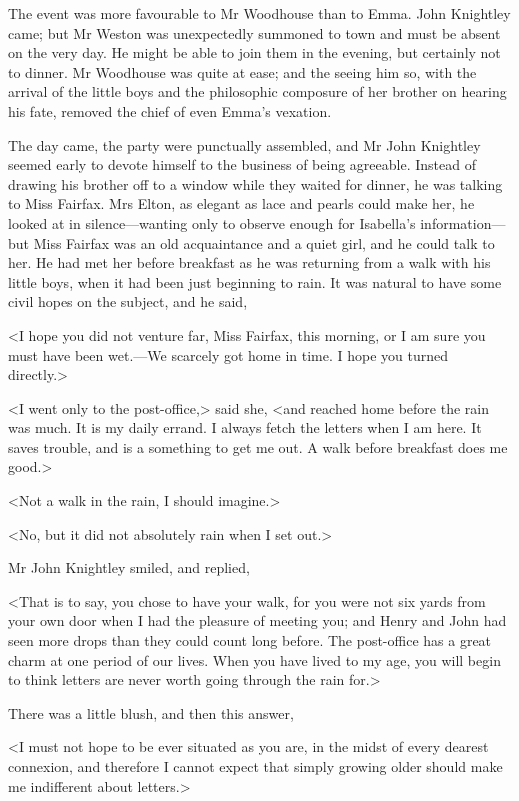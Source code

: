 The event was more favourable to Mr Woodhouse than to Emma. John Knightley came; but Mr Weston was unexpectedly summoned to town and must be absent on the very day. He might be able to join them in the evening, but certainly not to dinner. Mr Woodhouse was quite at ease; and the seeing him so, with the arrival of the little boys and the philosophic composure of her brother on hearing his fate, removed the chief of even Emma's vexation.

The day came, the party were punctually assembled, and Mr John Knightley seemed early to devote himself to the business of being agreeable. Instead of drawing his brother off to a window while they waited for dinner, he was talking to Miss Fairfax. Mrs Elton, as elegant as lace and pearls could make her, he looked at in silence—wanting only to observe enough for Isabella's information—but Miss Fairfax was an old acquaintance and a quiet girl, and he could talk to her. He had met her before breakfast as he was returning from a walk with his little boys, when it had been just beginning to rain. It was natural to have some civil hopes on the subject, and he said,

<I hope you did not venture far, Miss Fairfax, this morning, or I am sure you must have been wet.—We scarcely got home in time. I hope you turned directly.>

<I went only to the post-office,> said she, <and reached home before the rain was much. It is my daily errand. I always fetch the letters when I am here. It saves trouble, and is a something to get me out. A walk before breakfast does me good.>

<Not a walk in the rain, I should imagine.>

<No, but it did not absolutely rain when I set out.>

Mr John Knightley smiled, and replied,

<That is to say, you chose to have your walk, for you were not six yards from your own door when I had the pleasure of meeting you; and Henry and John had seen more drops than they could count long before. The post-office has a great charm at one period of our lives. When you have lived to my age, you will begin to think letters are never worth going through the rain for.>

There was a little blush, and then this answer,

<I must not hope to be ever situated as you are, in the midst of every dearest connexion, and therefore I cannot expect that simply growing older should make me indifferent about letters.>

